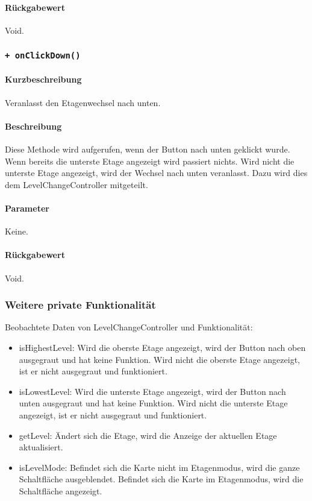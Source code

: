 \paragraph*{Rückgabewert}
Void.

\subsubsection*{\texttt{+ onClickDown()}}%
\paragraph*{Kurzbeschreibung}
Veranlasst den Etagenwechsel nach unten.
\paragraph*{Beschreibung}
Diese Methode wird aufgerufen, wenn der Button nach unten geklickt wurde. \\
Wenn bereits die unterste Etage angezeigt wird passiert nichts. 
Wird nicht die unterste Etage angezeigt, wird der Wechsel nach unten veranlasst.
Dazu wird dies dem LevelChangeController mitgeteilt.
\paragraph*{Parameter}
Keine.
\paragraph*{Rückgabewert}
Void.

\subsubsection*{Weitere private Funktionalität}%
Beobachtete Daten von LevelChangeController und Funktionalität:
\begin{itemize}
    \item isHighestLevel: Wird die oberste Etage angezeigt, wird der Button nach oben ausgegraut 
    und hat keine Funktion. Wird nicht die oberste Etage angezeigt, ist er nicht ausgegraut und funktioniert.
    \item isLowestLevel: Wird die unterste Etage angezeigt, wird der Button nach unten ausgegraut 
    und hat keine Funktion. Wird nicht die unterste Etage angezeigt, ist er nicht ausgegraut und funktioniert.
    \item getLevel: Ändert sich die Etage, wird die Anzeige der aktuellen Etage aktualisiert.
    \item isLevelMode: Befindet sich die Karte nicht im Etagenmodus, wird die ganze Schaltfläche ausgeblendet.
    Befindet sich die Karte im Etagenmodus, wird die Schaltfläche angezeigt.
\end{itemize}
